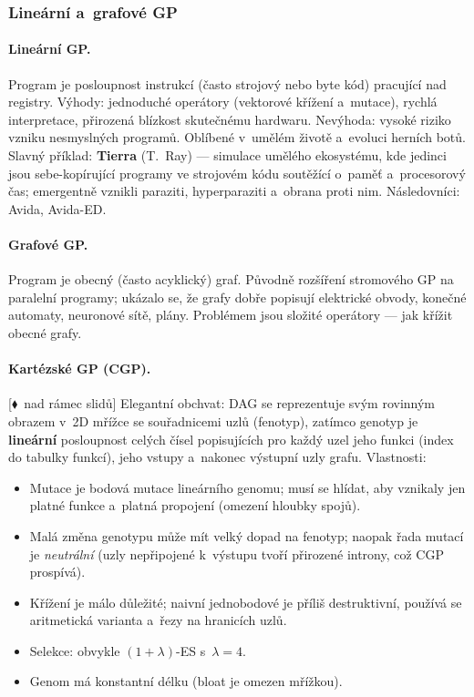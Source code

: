 \documentclass[11pt,a4paper]{article}
\theoremstyle{definition}
\newcommand{\mimo}{\textcolor{markcol}{\textsf{\footnotesize[$\blacklozenge$~nad rámec slidů]}}}
\begin{document}
\subsubsection{Lineární a~grafové GP}

\paragraph{Lineární GP.} Program je posloupnost instrukcí (často strojový nebo
byte kód) pracující nad registry. Výhody: jednoduché operátory (vektorové
křížení a~mutace), rychlá interpretace, přirozená blízkost skutečnému
hardwaru. Nevýhoda: vysoké riziko vzniku nesmyslných programů. Oblíbené
v~umělém životě a~evoluci herních botů. Slavný příklad: \textbf{Tierra}
(T.~Ray) --- simulace umělého ekosystému, kde jedinci jsou sebe-kopírující
programy ve strojovém kódu soutěžící o~paměť a~procesorový čas; emergentně
vznikli paraziti, hyperparaziti a~obrana proti nim. Následovníci: Avida,
Avida-ED.

\paragraph{Grafové GP.} Program je obecný (často acyklický) graf. Původně
rozšíření stromového GP na paralelní programy; ukázalo se, že grafy dobře
popisují elektrické obvody, konečné automaty, neuronové sítě, plány.
Problémem jsou složité operátory --- jak křížit obecné grafy.

\paragraph{Kartézské GP (CGP).} \mimo{} Elegantní obchvat: DAG se reprezentuje svým
rovinným obrazem v~2D mřížce se souřadnicemi uzlů (fenotyp), zatímco genotyp
je \textbf{lineární} posloupnost celých čísel popisujících pro každý uzel
jeho funkci (index do tabulky funkcí), jeho vstupy a~nakonec výstupní uzly
grafu. Vlastnosti:
\begin{itemize}
\item Mutace je bodová mutace lineárního genomu; musí se hlídat, aby vznikaly
  jen platné funkce a~platná propojení (omezení hloubky spojů).
\item Malá změna genotypu může mít velký dopad na fenotyp; naopak řada
  mutací je \emph{neutrální} (uzly nepřipojené k~výstupu tvoří přirozené
  introny, což CGP prospívá).
\item Křížení je málo důležité; naivní jednobodové je příliš destruktivní,
  používá se aritmetická varianta a~řezy na hranicích uzlů.
\item Selekce: obvykle $(1+\lambda)$-ES s~$\lambda = 4$.
\item Genom má konstantní délku (bloat je omezen mřížkou).
\end{itemize}
\end{document}
